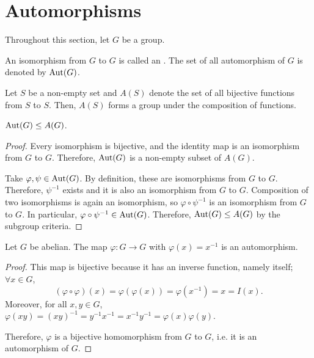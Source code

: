 \documentclass[11pt]{penrose}
\begin{document}
\section{Automorphisms}

Throughout this section, let $G$ be a group.

\begin{ndfn}[Automorphism]
    An isomorphism from $G$ to $G$ is called an . The set of all automorphism of $G$ is denoted by $\operatorname{Aut}(G)$.
\end{ndfn}

Let $S$ be a non-empty set and $A(S)$ denote the set of all bijective functions from $S$ to $S$. Then, $A(S)$ forms a group under the composition of functions.

\begin{nprop}
    $\operatorname{Aut}(G) \mathrel{\leq} A(G)$.
\end{nprop}
\begin{proof}
    Every isomorphism is bijective, and the identity map is an isomorphism from $G$ to $G$. Therefore, $\operatorname{Aut}(G)$ is a non-empty subset of $A(G)$.

    Take $\varphi, \psi \in \operatorname{Aut}(G)$. By definition, these are isomorphisms from $G$ to $G$. Therefore, $\psi^{-1}$ exists and it is also an isomorphism from $G$ to $G$. Composition of two isomorphisms is again an isomorphism, so $\varphi \circ \psi^{-1}$ is an isomorphism from $G$ to $G$. In particular, $\varphi \circ \psi^{-1} \in \operatorname{Aut}(G)$. Therefore, $\operatorname{Aut}(G) \mathrel{\leq} A(G)$ by the subgroup criteria.
\end{proof}

\begin{nprop}
    Let $G$ be abelian. The map $\varphi: G \to G$ with $\varphi(x) = x^{-1}$ is an automorphism.
\end{nprop}
\begin{proof}
    This map is bijective because it has an inverse function, namely itself; $\forall x \in G$,
    \begin{equation*}
        (\varphi \circ \varphi) (x) = \varphi( \varphi(x) ) = \varphi( x^{-1} ) = x = I(x).
    \end{equation*}
    Moreover, for all $x, y \in G$, $\varphi(xy) = (xy)^{-1} = y^{-1} x^{-1} = x^{-1} y^{-1} = \varphi(x) \varphi(y)$.

    Therefore, $\varphi$ is a bijective homomorphism from $G$ to $G$, i.e. it is an automorphism of $G$.
\end{proof}
\end{document}
